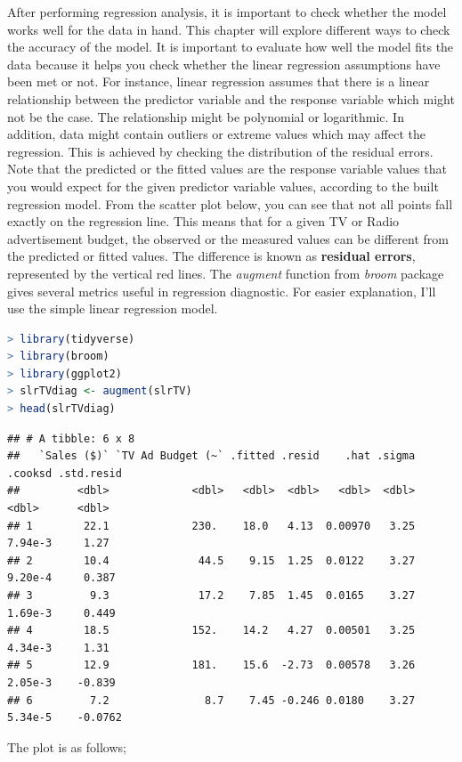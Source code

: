 \documentclass[
]{article}
\begin{document}
After performing regression analysis, it is important to check whether
the model works well for the data in hand. This chapter will explore
different ways to check the accuracy of the model. It is important to
evaluate how well the model fits the data because it helps you check
whether the linear regression assumptions have been met or not. For
instance, linear regression assumes that there is a linear relationship
between the predictor variable and the response variable which might not
be the case. The relationship might be polynomial or logarithmic. In
addition, data might contain outliers or extreme values which may affect
the regression. This is achieved by checking the distribution of the
residual errors. Note that the predicted or the fitted values are the
response variable values that you would expect for the given predictor
variable values, according to the built regression model. From the
scatter plot below, you can see that not all points fall exactly on the
regression line. This means that for a given TV or Radio advertisement
budget, the observed or the measured values can be different from the
predicted or fitted values. The difference is known as \textbf{residual
errors}, represented by the vertical red lines. The \emph{augment}
function from \emph{broom} package gives several metrics useful in
regression diagnostic. For easier explanation, I'll use the simple
linear regression model.

\begin{lstlisting}[language=R]
> library(tidyverse)
> library(broom)
> library(ggplot2)
> slrTVdiag <- augment(slrTV)
> head(slrTVdiag)
\end{lstlisting}

\begin{lstlisting}
## # A tibble: 6 x 8
##   `Sales ($)` `TV Ad Budget (~` .fitted .resid    .hat .sigma .cooksd .std.resid
##         <dbl>             <dbl>   <dbl>  <dbl>   <dbl>  <dbl>   <dbl>      <dbl>
## 1        22.1             230.    18.0   4.13  0.00970   3.25 7.94e-3     1.27  
## 2        10.4              44.5    9.15  1.25  0.0122    3.27 9.20e-4     0.387 
## 3         9.3              17.2    7.85  1.45  0.0165    3.27 1.69e-3     0.449 
## 4        18.5             152.    14.2   4.27  0.00501   3.25 4.34e-3     1.31  
## 5        12.9             181.    15.6  -2.73  0.00578   3.26 2.05e-3    -0.839 
## 6         7.2               8.7    7.45 -0.246 0.0180    3.27 5.34e-5    -0.0762
\end{lstlisting}

The plot is as follows;
\end{document}
